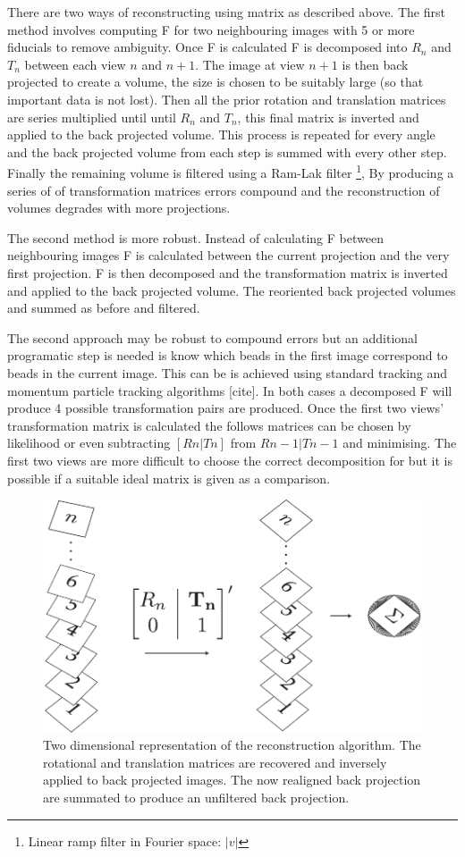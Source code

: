 There are two ways of reconstructing using matrix as described above.
The first method involves computing F for two neighbouring images with 5 or more fiducials to remove ambiguity.
Once F is calculated F is decomposed into $R_n$ and $T_n$ between each view $n$ and $n+1$.
The image at view $n+1$ is then back projected to create a volume, the size is chosen to be suitably large (so that important data is not lost).
Then all the prior rotation and translation matrices are series multiplied until until $R_n$ and $T_n$, this final matrix is inverted and applied to the back projected volume.
This process is repeated for every angle and the back projected volume from each step is summed with every other step.
Finally the remaining volume is filtered using a Ram-Lak filter \footnote{Linear ramp filter in Fourier space: $|v|$},
By producing a series of of transformation matrices errors compound and the reconstruction of volumes degrades with more projections.

The second method is more robust.
Instead of calculating F between neighbouring images F is calculated between the current projection and the very first projection.
F is then decomposed and the transformation matrix is inverted and applied to the back projected volume.
The reoriented back projected volumes and summed as before and filtered.

The second approach may be robust to compound errors but an additional programatic step is needed is know which beads in the first image correspond to beads in the current image.
This can be is achieved using standard tracking and momentum particle tracking algorithms [cite].
In both cases a decomposed F will produce 4 possible transformation pairs %
are produced.
Once the first two views' transformation matrix is calculated the follows matrices can be chosen by likelihood or even subtracting \([Rn|Tn]\) from \(Rn-1|Tn-1\) and minimising.
The first two views are more difficult to choose the correct decomposition for but it is possible if a suitable ideal matrix is given as a comparison.


\begin{figure}
  \centering
  \includegraphics{Chapters/flopt/Figs/PDF/flopt_algorithm}
  \caption{Two dimensional representation of the reconstruction algorithm.
  The rotational and translation matrices are recovered and inversely applied to back projected images.
  The now realigned back projection are summated to produce an unfiltered back projection.}
\end{figure}

